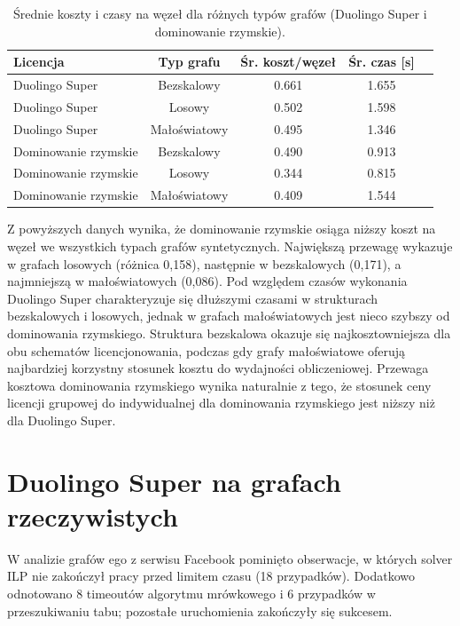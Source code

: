 \begin{table}[H]
  \centering
  \caption{Średnie koszty i czasy na węzeł dla różnych typów grafów (Duolingo Super i dominowanie rzymskie).}
  \label{tab:duo-synth-summary-times}
  \begin{tabular}{lcccc}
    \toprule
    \textbf{Licencja}    & \textbf{Typ grafu} & \textbf{Śr. koszt/węzeł} & \textbf{Śr. czas [s]} \\
    \midrule
    Duolingo Super       & Bezskalowy         & 0.661                    & 1.655                 \\
    Duolingo Super       & Losowy             & 0.502                    & 1.598                 \\
    Duolingo Super       & Małoświatowy       & 0.495                    & 1.346                 \\
    Dominowanie rzymskie & Bezskalowy         & 0.490                    & 0.913                 \\
    Dominowanie rzymskie & Losowy             & 0.344                    & 0.815                 \\
    Dominowanie rzymskie & Małoświatowy       & 0.409                    & 1.544                 \\
    \bottomrule
  \end{tabular}
\end{table}

Z powyższych danych wynika, że dominowanie rzymskie osiąga niższy koszt na węzeł we wszystkich typach grafów syntetycznych. Największą przewagę wykazuje w grafach losowych (różnica 0,158), następnie w bezskalowych (0,171), a najmniejszą w małoświatowych (0,086). Pod względem czasów wykonania Duolingo Super charakteryzuje się dłuższymi czasami w strukturach bezskalowych i losowych, jednak w grafach małoświatowych jest nieco szybszy od dominowania rzymskiego. Struktura bezskalowa okazuje się najkosztowniejsza dla obu schematów licencjonowania, podczas gdy grafy małoświatowe oferują najbardziej korzystny stosunek kosztu do wydajności obliczeniowej. Przewaga kosztowa dominowania rzymskiego wynika naturalnie z tego, że stosunek ceny licencji grupowej do indywidualnej dla dominowania rzymskiego jest niższy niż dla Duolingo Super.


\section{Duolingo Super na grafach rzeczywistych}
W analizie grafów ego z serwisu Facebook pominięto obserwacje, w których solver ILP nie zakończył pracy przed limitem czasu (18 przypadków). Dodatkowo odnotowano 8 timeoutów algorytmu mrówkowego i 6 przypadków w przeszukiwaniu tabu; pozostałe uruchomienia zakończyły się sukcesem.

